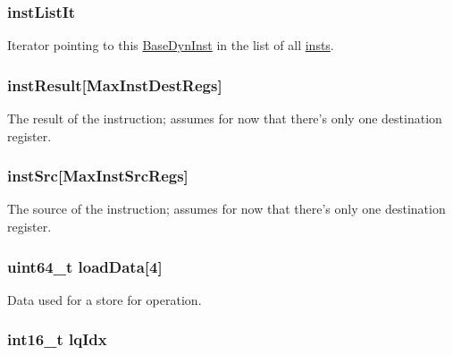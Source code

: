 \hypertarget{classInOrderDynInst_ae774064514a3dc6a8d932c1fb975d37f}{
\subsubsection[{instListIt}]{ {\bf instListIt}}}
\label{classInOrderDynInst_ae774064514a3dc6a8d932c1fb975d37f}
Iterator pointing to this \hyperlink{classBaseDynInst}{BaseDynInst} in the list of all \hyperlink{namespaceinsts}{insts}. \hypertarget{classInOrderDynInst_a55a0fc52567dcc9b92b49d263cf0fb65}{
\subsubsection[{instResult}]{ {\bf instResult}\mbox{[}MaxInstDestRegs\mbox{]}}}
\label{classInOrderDynInst_a55a0fc52567dcc9b92b49d263cf0fb65}
The result of the instruction; assumes for now that there's only one destination register. \hypertarget{classInOrderDynInst_aaf92019c0f8bc5367efa5d86afbcdf7d}{
\subsubsection[{instSrc}]{ {\bf instSrc}\mbox{[}MaxInstSrcRegs\mbox{]}}}
\label{classInOrderDynInst_aaf92019c0f8bc5367efa5d86afbcdf7d}
The source of the instruction; assumes for now that there's only one destination register. \hypertarget{classInOrderDynInst_a3f140b7af15b1d63fd19728f240c7260}{
\subsubsection[{loadData}]{\setlength{\rightskip}{0pt plus 5cm}uint64\_\-t {\bf loadData}\mbox{[}4\mbox{]}}}
\label{classInOrderDynInst_a3f140b7af15b1d63fd19728f240c7260}
Data used for a store for operation. \hypertarget{classInOrderDynInst_a543896e8c656ce7cce978a1ec4d29afe}{
\subsubsection[{lqIdx}]{\setlength{\rightskip}{0pt plus 5cm}int16\_\-t {\bf lqIdx}}}
